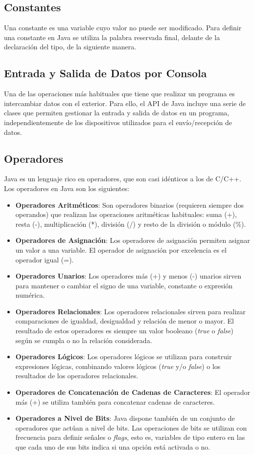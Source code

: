\documentclass[11pt, twocolumn]{article}
\begin{document}
  \subsection*{Constantes}
  Una constante es una variable cuyo valor no puede ser modificado. Para definir una constante en Java se utiliza la palabra reservada final, delante de la declaración del tipo, de la siguiente manera.

  \subsection*{Entrada y Salida de Datos por Consola}
  Una de las operaciones más habituales que tiene que realizar un programa es intercambiar datos con el exterior. Para ello, el API de Java incluye una serie de clases que permiten gestionar la entrada y salida de datos en un programa, independientemente de los dispositivos utilizados para el envío/recepción de datos.

  \subsection*{Operadores}
  Java es un lenguaje rico en operadores, que son casi idénticos a los de C/C++. Los operadores en Java son los siguientes:

  \begin{itemize}
    \item \textbf{Operadores Aritméticos}: Son operadores binarios (requieren siempre dos operandos) que realizan las operaciones aritméticas habituales: suma (+), resta (-), multiplicación (*), división (/) y resto de la división o módulo (\%).
    \item \textbf{Operadores de Asignación}: Los operadores de asignación permiten asignar un valor a una variable. El operador de asignación por excelencia es el operador igual (=).
    \item \textbf{Operadores Unarios}: Los operadores más (+) y menos (-) unarios sirven para mantener o cambiar el signo de una variable, constante o expresión numérica.
    \item \textbf{Operadores Relacionales}: Los operadores relacionales sirven para realizar comparaciones de igualdad, desigualdad y relación de menor o mayor. El resultado de estos operadores es siempre un valor booleano (\textit{true} o \textit{false}) según se cumpla o no la relación considerada.
    \item \textbf{Operadores Lógicos}: Los operadores lógicos se utilizan para construir expresiones lógicas, combinando valores lógicos (\textit{true} y/o \textit{false}) o los resultados de los operadores relacionales.
    \item \textbf{Operadores de Concatenación de Cadenas de Caracteres}: El operador más (+) se utiliza también para concatenar cadenas de caracteres.
    \item \textbf{Operadores a Nivel de Bits}: Java dispone también de un conjunto de operadores que actúan a nivel de bits. Las operaciones de bits se utilizan con frecuencia para definir señales o \textit{flags}, esto es, variables de tipo entero en las que cada uno de sus bits indica si una opción está activada o no.
  \end{itemize}
\end{document}
